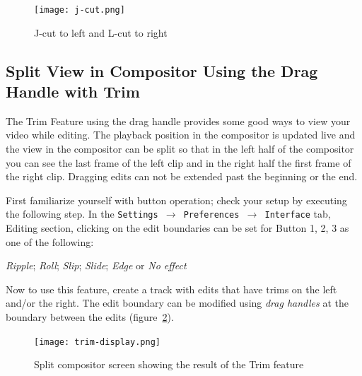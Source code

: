 \begin{figure}[htpb]
    \centering
    \texttt{[image: j-cut.png]}
    \caption{J-cut to left and L-cut to right}
    \label{fig:j-cut}
\end{figure}


\subsection{Split View in Compositor Using the Drag Handle with Trim}%
\label{sub:split_view_compositor_using_drag_trim}

The Trim Feature using the drag handle provides some good ways to
view your video while editing.  The playback position in the
compositor is updated live and the view in the compositor can be
split so that in the left half of the compositor you can see the
last frame of the left clip and in the right half the first frame of
the right clip.  Dragging edits can not be extended past the
beginning or the end.

First familiarize yourself with button operation; check your setup
by executing the following step.  In the \texttt{Settings
  $\rightarrow$ Preferences $\rightarrow$ Interface} tab, Editing
section, clicking on the edit boundaries can be set for Button 1, 2,
3 as one of the following:

\textit{Ripple}; \textit{Roll}; \textit{Slip}; \textit{Slide};
\textit{Edge} or \textit{No effect}

Now to use this feature, create a track with edits that have trims
on the left and/or the right. The edit boundary can be modified
using \textit{drag handles} at the boundary between the edits
(figure~\ref{fig:trim-display}).

\begin{figure}[htpb]
  \centering
  \texttt{[image: trim-display.png]}
  \caption{Split compositor screen showing the result of the Trim feature}
  \label{fig:trim-display}
\end{figure}


